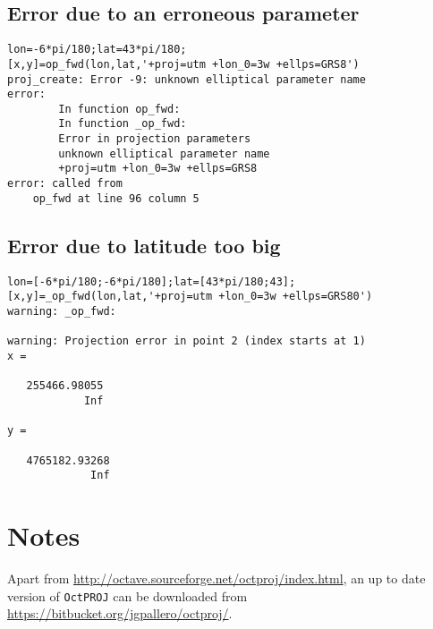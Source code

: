 \documentclass[10pt,a4paper]{article}
\newcommand{\octproj}{\texttt{OctPROJ}}
\begin{document}
\subsection{Error due to an erroneous parameter}

\begin{verbatim}
lon=-6*pi/180;lat=43*pi/180;
[x,y]=op_fwd(lon,lat,'+proj=utm +lon_0=3w +ellps=GRS8')
proj_create: Error -9: unknown elliptical parameter name
error:
        In function op_fwd:
        In function _op_fwd:
        Error in projection parameters
        unknown elliptical parameter name
        +proj=utm +lon_0=3w +ellps=GRS8
error: called from
    op_fwd at line 96 column 5
\end{verbatim}

\subsection{Error due to latitude too big}

\begin{verbatim}
lon=[-6*pi/180;-6*pi/180];lat=[43*pi/180;43];
[x,y]=_op_fwd(lon,lat,'+proj=utm +lon_0=3w +ellps=GRS80')
warning: _op_fwd:

warning: Projection error in point 2 (index starts at 1)
x =

   255466.98055
            Inf

y =

   4765182.93268
             Inf
\end{verbatim}

\section{Notes}

Apart from \url{http://octave.sourceforge.net/octproj/index.html}, an up to date
version of \octproj{} can be downloaded from
\url{https://bitbucket.org/jgpallero/octproj/}.
\end{document}

